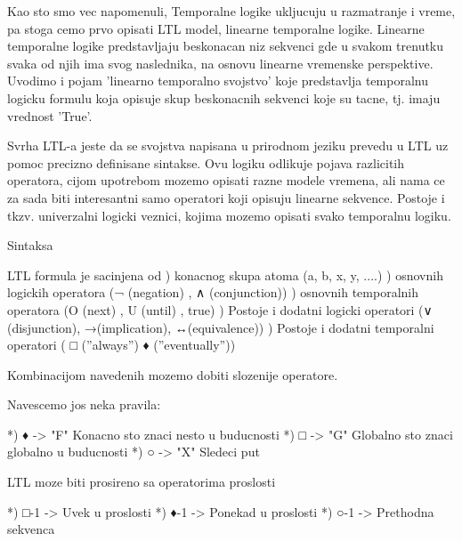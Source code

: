 \documentclass[a4paper]{article}
\begin{document}
{Kao sto smo vec napomenuli, Temporalne logike ukljucuju u razmatranje i vreme, pa stoga cemo prvo opisati LTL model, linearne temporalne logike. Linearne temporalne logike predstavljaju beskonacan niz sekvenci gde u svakom trenutku svaka od njih ima svog naslednika, na osnovu linearne vremenske perspektive. Uvodimo i pojam 'linearno temporalno svojstvo' koje predstavlja temporalnu logicku formulu koja opisuje skup beskonacnih sekvenci koje su tacne, tj. imaju vrednost 'True'. 

Svrha LTL-a jeste da se svojstva napisana u prirodnom jeziku prevedu u LTL uz pomoc precizno definisane sintakse. Ovu logiku odlikuje pojava razlicitih operatora, cijom upotrebom mozemo opisati razne modele vremena, ali nama ce za sada biti interesantni samo operatori koji opisuju linearne sekvence. Postoje i tkzv. univerzalni logicki veznici, kojima mozemo opisati svako temporalnu logiku.

Sintaksa

LTL formula je sacinjena od ) konacnog skupa atoma (a, b, x, y, ....) ) osnovnih logickih operatora (¬ (negation) , ∧ (conjunction)) ) osnovnih temporalnih operatora (O (next) , U (until) , true) ) Postoje i dodatni logicki operatori (∨ (disjunction), →(implication), ↔(equivalence)) ) Postoje i dodatni temporalni operatori ( □ (”always”) ♦ (”eventually”)) \newline

Kombinacijom navedenih mozemo dobiti slozenije operatore.

Navescemo jos neka pravila: \newline

	*) ♦ -> "F" Konacno sto znaci nesto u buducnosti \newline
	*) □ -> "G" Globalno sto znaci globalno u buducnosti \newline
	*) ○ -> "X" Sledeci put \newline

LTL moze biti prosireno sa operatorima proslosti \newline
	
	*) □-1 -> Uvek u proslosti \newline
	*) ♦-1 -> Ponekad u proslosti \newline
	*) ○-1 -> Prethodna sekvenca \newline

}
\end{document}
